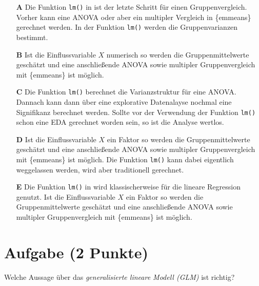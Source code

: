 \documentclass[a4paper, 9pt]{scrartcl}\usepackage[]{graphicx}\usepackage[]{xcolor}
\begin{document}
\begin{enumerate}
\item [\textbf{A} \msquare] Die Funktion \texttt{lm()} in \Rlogo ist der letzte Schritt für einen Gruppenvergleich. Vorher kann eine ANOVA oder aber ein multipler Vergleich in \{emmeans\} gerechnet werden. In der Funktion  \texttt{lm()} werden die Gruppenvarianzen bestimmt.
\item [\textbf{B} \msquare] Ist die Einflussvariable $X$ numerisch so werden die Gruppenmittelwerte geschätzt und eine anschließende ANOVA sowie multipler Gruppenvergleich mit \{emmeans\} ist möglich.
\item [\textbf{C} \msquare] Die Funktion \texttt{lm()} berechnet die Varianzstruktur für eine ANOVA. Dannach kann dann über eine explorative Datenalayse nochmal eine Signifikanz berechnet werden. Sollte vor der Verwendung der Funktion \texttt{lm()} schon eine EDA gerechnet worden sein, so ist die Analyse wertlos.
\item [\textbf{D} \msquare] Ist die Einflussvariable $X$ ein Faktor so werden die Gruppenmittelwerte geschätzt und eine anschließende ANOVA sowie multipler Gruppenvergleich mit \{emmeans\} ist möglich. Die Funktion \texttt{lm()} kann dabei eigentlich weggelassen werden, wird aber traditionell gerechnet.
\item [\textbf{E} \msquare] Die Funktion \texttt{lm()} in \Rlogo wird klassischerweise für die lineare Regression genutzt. Ist die Einflussvariable $X$ ein Faktor so werden die Gruppenmittelwerte geschätzt und eine anschließende ANOVA sowie multipler Gruppenvergleich mit \{emmeans\} ist möglich.
\end{enumerate}

\section{Aufgabe \hfill (2 Punkte)}



Welche Aussage über das \textit{generalisierte lineare Modell (GLM)} ist richtig?
\end{document}
